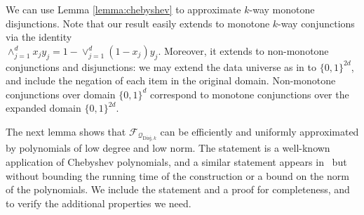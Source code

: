 \documentclass[11pt]{article}
\newcommand\cF{\mathcal{F}}
\newcommand\cQ{\mathcal{Q}}
\theoremstyle{definition}
\begin{document}
We can use Lemma \ref{lemma:chebyshev} to approximate $k$-way monotone disjunctions. Note that our result easily extends to monotone $k$-way conjunctions via the identity \\ $\wedge_{j=1}^{d} x_j y_j = 1 - \vee_{j=1}^{d} (1-x_j) y_j$. 
Moreover, it extends to non-monotone conjunctions and disjunctions: we may extend the data universe
as in \cite[Theorem 1.2]{HardtRoSe12} to $\{0, 1\}^{2d}$, and include the negation of each item in the original domain. Non-monotone conjunctions over domain $\{0, 1\}^d$ correspond to monotone conjunctions over the expanded domain $\{0,1\}^{2d}$.

The next lemma shows that $\cF_{\cQ_{\mathrm{Disj}, k}}$ can be efficiently and uniformly approximated by polynomials of low degree and low norm.  The statement is a well-known application of Chebyshev polynomials, and a similar statement appears in~\cite{HardtRoSe12} but without bounding the running time of the construction or a bound on the norm of the polynomials.  We include the statement and a proof for completeness, and to verify the additional properties we need. 
\end{document}
